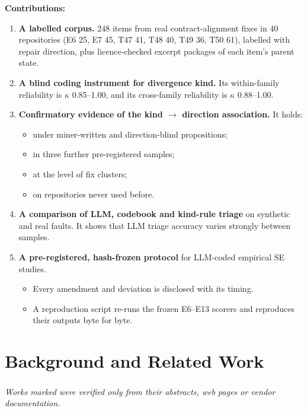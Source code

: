 \documentclass[acmsmall,screen,review,anonymous]{acmart}
\newcommand{\inferred}{\textsuperscript{\dag}}
\begin{document}
\textbf{Contributions:}
\begin{enumerate}
\item \textbf{A labelled corpus.} 248 items from real contract-alignment fixes in 40 repositories (E6 25, E7 45, T47 41, T48 40, T49 36, T50 61), labelled with repair direction, plus licence-checked excerpt packages of each item's parent state.
\item \textbf{A blind coding instrument for divergence kind.} Its within-family reliability is $\kappa$ 0.85--1.00, and its cross-family reliability is $\kappa$ 0.88--1.00.
\item \textbf{Confirmatory evidence of the kind $\rightarrow$ direction association.} It holds:
\begin{itemize}
\item under miner-written and direction-blind propositions;
\item in three further pre-registered samples;
\item at the level of fix clusters;
\item on repositories never used before.
\end{itemize}
\item \textbf{A comparison of LLM, codebook and kind-rule triage} on synthetic and real faults. It shows that LLM triage accuracy varies strongly between samples.
\item \textbf{A pre-registered, hash-frozen protocol} for LLM-coded empirical SE studies.
\begin{itemize}
\item Every amendment and deviation is disclosed with its timing.
\item A reproduction script re-runs the frozen E6--E13 scorers and reproduces their outputs byte for byte.
\end{itemize}
\end{enumerate}

\section{Background and Related Work}
\emph{Works marked \inferred{} were verified only from their abstracts, web pages or vendor documentation.}
\end{document}
